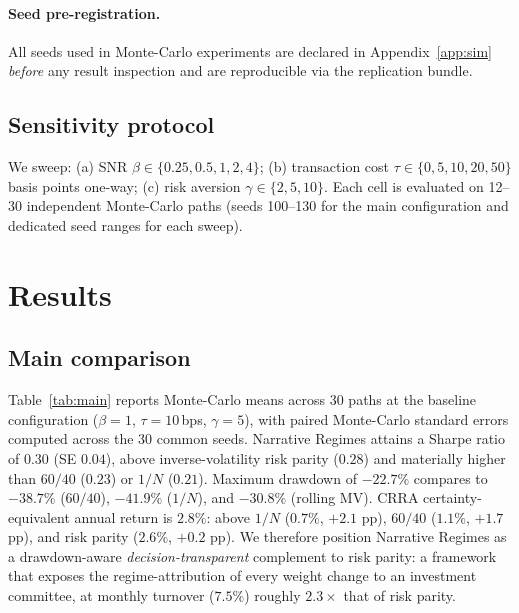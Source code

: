 \documentclass[review,12pt,authoryear]{elsarticle}
\begin{document}
\paragraph{Seed pre-registration.} All seeds used in Monte-Carlo experiments are
declared in Appendix~\ref{app:sim} \emph{before} any result inspection and are reproducible
via the replication bundle.

\subsection{Sensitivity protocol}
We sweep: (a) SNR $\beta \in \{0.25,0.5,1,2,4\}$; (b) transaction cost
$\tau \in \{0,5,10,20,50\}$ basis points one-way; (c) risk aversion
$\gamma \in \{2,5,10\}$. Each cell is evaluated on 12--30 independent Monte-Carlo paths
(seeds 100--130 for the main configuration and dedicated seed ranges for each sweep).

\section{Results}
\label{sec:results}

\subsection{Main comparison}
Table~\ref{tab:main} reports Monte-Carlo means across 30 paths at the baseline configuration
($\beta=1$, $\tau=10$\,bps, $\gamma=5$), with paired Monte-Carlo standard errors computed
across the 30 common seeds. Narrative Regimes attains a Sharpe ratio of $0.30$ (SE $0.04$),
above inverse-volatility risk parity ($0.28$) and materially higher than $60/40$ ($0.23$)
or $1/N$ ($0.21$). Maximum drawdown of $-22.7\%$ compares to $-38.7\%$ ($60/40$),
$-41.9\%$ ($1/N$), and $-30.8\%$ (rolling MV). CRRA certainty-equivalent annual return is
$2.8\%$: above $1/N$ ($0.7\%$, $+2.1$ pp), $60/40$ ($1.1\%$, $+1.7$ pp), and risk parity
($2.6\%$, $+0.2$ pp). We therefore position Narrative Regimes as a drawdown-aware
\emph{decision-transparent} complement to risk parity: a framework that exposes the
regime-attribution of every weight change to an investment committee, at monthly turnover
($7.5\%$) roughly $2.3\times$ that of risk parity.
\end{document}
